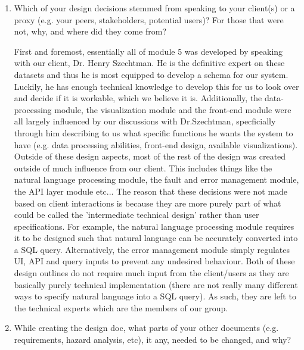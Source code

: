 \documentclass[12pt, titlepage]{article}
\begin{document}
\begin{enumerate}
  \item Which of your design decisions stemmed from speaking to your client(s)
  or a proxy (e.g. your peers, stakeholders, potential users)? For those that
  were not, why, and where did they come from?

    First and foremost, essentially all of module 5 was developed by speaking with our client, Dr. Henry Szechtman. He
    is the definitive expert on these datasets and thus he is most equipped to develop a schema for our system. Luckily, he
    has enough technical knowledge to develop this for us to look over and decide if it is workable, which we believe it is.
    Additionally, the data-processing module, the visualization module and the front-end module were all largely influenced by our discussions
    with Dr.Szechtman, specficially through him describing to us what specific functions he wants the system to have (e.g. data processing abilities,
    front-end design, available visualizations). Outside of these design aspects, most of the rest of the design was created outside of
    much influence from our client. This includes things like the natural language processing module, the fault and error management module, the API
    layer module etc... The reason that these decisions were not made based on client interactions is because they are more purely part
    of what could be called the 'intermediate technical design' rather than user specifications. For example, the natural language processing
    module requires it to be designed such that natural language can be accurately converted into a SQL query. Alternatively, the error management
    module simply regulates UI, API and query inputs to prevent any undesired behaviour. Both of these design outlines do not require
    much input from the client/users as they are basically purely technical implementation (there are not really many different ways to specify natural
    language into a SQL query). As such, they are left to the technical experts which are the members of our group.

  \item While creating the design doc, what parts of your other documents (e.g.
  requirements, hazard analysis, etc), it any, needed to be changed, and why?


\end{enumerate}
\end{document}
